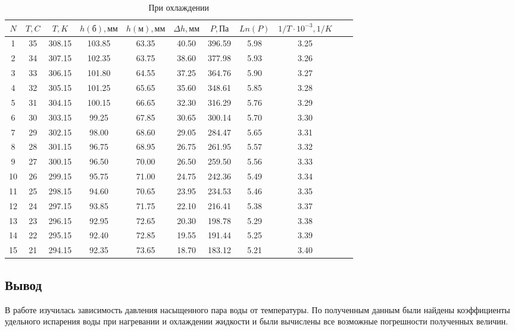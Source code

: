 \documentclass[a4paper,11.5pt]{article} %
\begin{document}
\begin{center}
\begin{table}[h]
\caption{При охлаждении}
\begin{tabular}{|c|c|c|c|c|c|c|c|c|c|c|} \hline
$N$ & $T, C$ & $T, K$ & $h(\text{б}), \text{мм}$ & $h(\text{м}), \text{мм}$ & $\Delta h, \text{мм}$ & $P, Па$ & $Ln(P)$ & $1/T\cdot10^{-3}, 1/K$ \\ \hline
 1 & 35 & 308.15 & 103.85 & 63.35 & 40.50 & 396.59 & 5.98 & 3.25  \\ \hline
 2 & 34 & 307.15 & 102.35 & 63.75 & 38.60 & 377.98 & 5.93 & 3.26  \\ \hline
 3 & 33 & 306.15 & 101.80 & 64.55 & 37.25 & 364.76 & 5.90 & 3.27  \\ \hline
 4 & 32 & 305.15 & 101.25 & 65.65 & 35.60 & 348.61 & 5.85 & 3.28  \\ \hline
 5 & 31 & 304.15 & 100.15 & 66.65 & 32.30 & 316.29 & 5.76 & 3.29  \\ \hline
 6 & 30 & 303.15 &  99.25 & 67.85 & 30.65 & 300.14 & 5.70 & 3.30  \\ \hline
 7 & 29 & 302.15 &  98.00 & 68.60 & 29.05 & 284.47 & 5.65 & 3.31  \\ \hline
 8 & 28 & 301.15 &  96.75 & 68.95 & 26.75 & 261.95 & 5.57 & 3.32  \\ \hline
 9 & 27 & 300.15 &  96.50 & 70.00 & 26.50 & 259.50 & 5.56 & 3.33  \\ \hline
10 & 26 & 299.15 &  95.75 & 71.00 & 24.75 & 242.36 & 5.49 & 3.34  \\ \hline
11 & 25 & 298.15 &  94.60 & 70.65 & 23.95 & 234.53 & 5.46 & 3.35  \\ \hline
12 & 24 & 297.15 &  93.85 & 71.75 & 22.10 & 216.41 & 5.38 & 3.37  \\ \hline
13 & 23 & 296.15 &  92.95 & 72.65 & 20.30 & 198.78 & 5.29 & 3.38  \\ \hline
14 & 22 & 295.15 &  92.40 & 72.85 & 19.55 & 191.44 & 5.25 & 3.39  \\ \hline
15 & 21 & 294.15 &  92.35 & 73.65 & 18.70 & 183.12 & 5.21 & 3.40  \\ \hline
\end{tabular}
\end{table}
\end{center}
\newpage

\subsection{Вывод}

В работе изучилась зависимость давления насыщенного пара воды от температуры. По полученным данным были найдены коэффициенты удельного испарения воды при нагревании и охлаждении жидкости и были вычислены все возможные погрешности полученных величин.
\end{document}
